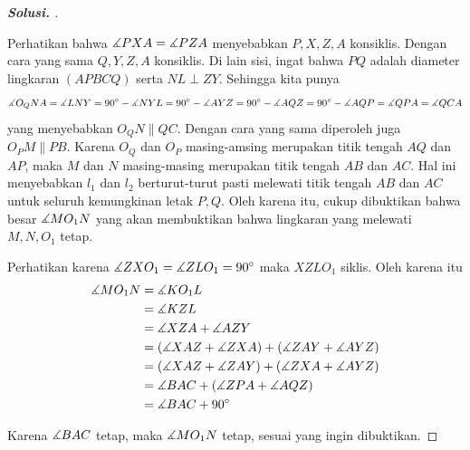 \documentclass[letterpaper, 13pt]{scrartcl}
\begin{document}
\begin{proof}[\textbf{Solusi. }]
\begin{center}
\end{center}

Perhatikan bahwa $\measuredangle PXA = \measuredangle PZA$ menyebabkan $P,X,Z,A$ konsiklis. Dengan cara yang sama $Q,Y,Z,A$ konsiklis. Di lain sisi, ingat bahwa $PQ$ adalah diameter lingkaran $(APBCQ)$ serta $NL \perp ZY$. Sehingga kita punya $$\measuredangle O_QNA = \measuredangle LNY = 90^\circ-\measuredangle NYL = 90^\circ-\measuredangle AYZ = 90^\circ-\measuredangle AQZ = 90^\circ-\measuredangle AQP=\measuredangle QPA = \measuredangle QCA$$ yang menyebabkan $O_QN \parallel QC$. Dengan cara yang sama diperoleh juga $O_PM \parallel PB$. Karena $O_Q$ dan $O_P$ masing-amsing merupakan titik tengah $AQ$ dan $AP$, maka $M$ dan $N$ masing-masing merupakan titik tengah $AB$ dan $AC$. Hal ini menyebabkan $l_1$ dan $l_2$ berturut-turut pasti melewati titik tengah $AB$ dan $AC$ untuk seluruh kemungkinan letak $P,Q$. Oleh karena itu, cukup dibuktikan bahwa besar $\measuredangle MO_1N$ yang akan membuktikan bahwa lingkaran yang melewati $M,N,O_1$ tetap.

Perhatikan karena $\measuredangle ZXO_1 = \measuredangle ZLO_1 = 90^\circ$ maka $XZLO_1$ siklis. Oleh karena itu 
\begin{align*}
    \measuredangle MO_1N 
    &= \measuredangle KO_1L\\ 
    &= \measuredangle KZL\\
    &= \measuredangle XZA + \measuredangle AZY\\ 
    &= (\measuredangle XAZ + \measuredangle ZXA) + (\measuredangle ZAY + \measuredangle AYZ)\\
    &= (\measuredangle XAZ + \measuredangle ZAY)+ (\measuredangle ZXA + \measuredangle AYZ)\\
    &= \measuredangle BAC + (\measuredangle ZPA + \measuredangle AQZ)\\
    &= \measuredangle BAC + 90^\circ
\end{align*}

Karena $\measuredangle BAC$ tetap, maka $\measuredangle MO_1N$ tetap, sesuai yang ingin dibuktikan.
    
\end{proof}
\end{document}
